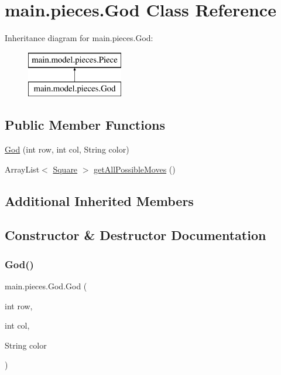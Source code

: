 \hypertarget{classmain_1_1pieces_1_1_god}{}\section{main.\+pieces.\+God Class Reference}
\label{classmain_1_1pieces_1_1_god}
Inheritance diagram for main.\+pieces.\+God\+:\begin{figure}[H]
\begin{center}
\leavevmode
\includegraphics[height=2.000000cm]{classmain_1_1pieces_1_1_god}
\end{center}
\end{figure}
\subsection*{Public Member Functions}
\begin{DoxyCompactItemize}
\item 
\hyperlink{classmain_1_1pieces_1_1_god_a6aeb5f1261a89785463207d9769200a8}{God} (int row, int col, String color)
\item 
Array\+List$<$ \hyperlink{classmain_1_1_square}{Square} $>$ \hyperlink{classmain_1_1pieces_1_1_god_a1c381fdce437b04c1c16f2881760e9d5}{get\+All\+Possible\+Moves} ()
\end{DoxyCompactItemize}
\subsection*{Additional Inherited Members}


\subsection{Constructor \& Destructor Documentation}
\mbox{\label{classmain_1_1pieces_1_1_god_a6aeb5f1261a89785463207d9769200a8}} 
\subsubsection{\texorpdfstring{God()}{God()}}
{\footnotesize\ttfamily main.\+pieces.\+God.\+God (\begin{DoxyParamCaption}\item[{int}]{row,  }\item[{int}]{col,  }\item[{String}]{color }\end{DoxyParamCaption})\hspace{0.3cm}{\ttfamily [inline]}}


